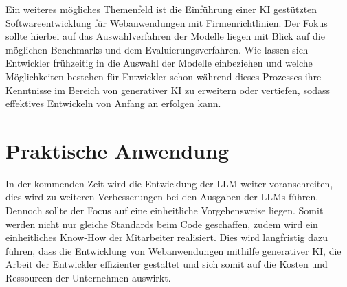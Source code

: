 Ein weiteres mögliches Themenfeld ist die Einführung einer KI gestützten Softwareentwicklung für Webanwendungen mit Firmenrichtlinien. Der Fokus sollte hierbei auf das Auswahlverfahren der Modelle liegen mit Blick auf die möglichen Benchmarks und dem Evaluierungsverfahren. Wie lassen sich Entwickler frühzeitig in die Auswahl der Modelle einbeziehen und welche Möglichkeiten bestehen für Entwickler schon während dieses Prozesses ihre Kenntnisse im Bereich von generativer KI zu erweitern oder vertiefen, sodass effektives Entwickeln von Anfang an erfolgen kann.\vspace{0.2cm}





\section{Praktische Anwendung}
In der kommenden Zeit wird die Entwicklung der LLM weiter voranschreiten, dies wird zu weiteren Verbesserungen bei den Ausgaben der LLMs führen. Dennoch sollte der Focus auf eine einheitliche Vorgehensweise liegen. Somit werden nicht nur gleiche Standards beim Code geschaffen, zudem wird ein einheitliches Know-How der Mitarbeiter realisiert. Dies wird langfristig dazu führen, dass die Entwicklung von Webanwendungen mithilfe generativer KI, die Arbeit der Entwickler effizienter gestaltet und sich somit auf die Kosten und Ressourcen der Unternehmen auswirkt.\vspace{0.2cm}

